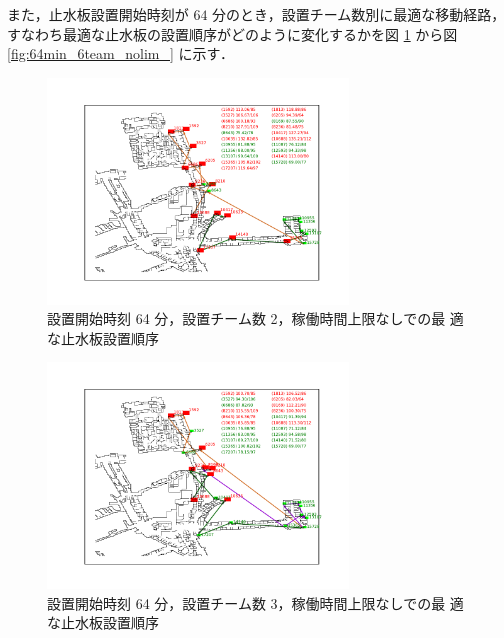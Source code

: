 \documentclass[a4paper,12pt,fleqn]{jarticle}
\begin{document}
また，止水板設置開始時刻が $64$ 分のとき，設置チーム数別に最適な移動経路，
すなわち最適な止水板の設置順序がどのように変化するかを図
\ref{fig:64min_2team_nolim_} から図 \ref{fig:64min_6team_nolim_} に示す．

\newpage

\begin{figure}[htpb]
 \begin{center}
  \includegraphics[width=8cm,trim=100 50 100 50]{fig/64min_2team_nolim.pdf}
  \caption{設置開始時刻 64 分，設置チーム数 2，稼働時間上限なしでの最
  適な止水板設置順序}
  \label{fig:64min_2team_nolim_}
 \end{center}
\end{figure}

\begin{figure}[htpb]
 \begin{center}
  \includegraphics[width=8cm,trim=100 50 100 50]{fig/64min_3team_nolim.pdf}
  \caption{設置開始時刻 64 分，設置チーム数 3，稼働時間上限なしでの最
  適な止水板設置順序}
  \label{fig:64min_3team_nolim_}
 \end{center}
\end{figure}
\end{document}
